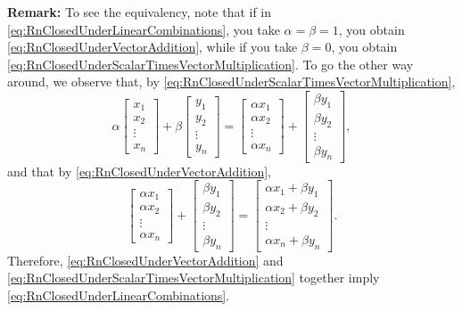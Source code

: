 \textbf{Remark:} To see the equivalency, note that  if in \eqref{eq:RnClosedUnderLinearCombinations},  you take $\alpha=\beta=1$, you obtain \eqref{eq:RnClosedUnderVectorAddition}, while if you take $\beta = 0$, you obtain \eqref{eq:RnClosedUnderScalarTimesVectorMultiplication}.  To go the other way around, we observe that, by \eqref{eq:RnClosedUnderScalarTimesVectorMultiplication},
$$   \alpha  \begin{bmatrix} x_1 \\ x_2 \\ \vdots \\ x_n\end{bmatrix} + \beta
 \begin{bmatrix} y_1 \\ y_2 \\ \vdots \\ y_n\end{bmatrix} =
   \begin{bmatrix} \alpha x_1 \\ \alpha x_2  \\ \vdots \\ \alpha x_n \end{bmatrix} + \begin{bmatrix} \beta y_1\\  \beta y_2 \\ \vdots \\ \beta y_n\end{bmatrix},$$
   and that by \eqref{eq:RnClosedUnderVectorAddition},
   $$
   \begin{bmatrix} \alpha x_1 \\ \alpha x_2  \\ \vdots \\ \alpha x_n \end{bmatrix} + \begin{bmatrix} \beta y_1\\  \beta y_2 \\ \vdots \\ \beta y_n\end{bmatrix}=  \begin{bmatrix} \alpha x_1 + \beta y_1\\ \alpha x_2 + \beta y_2 \\ \vdots \\ \alpha x_n + \beta y_n\end{bmatrix}.$$ 
   Therefore, \eqref{eq:RnClosedUnderVectorAddition} and \eqref{eq:RnClosedUnderScalarTimesVectorMultiplication} together imply \eqref{eq:RnClosedUnderLinearCombinations}.
   
